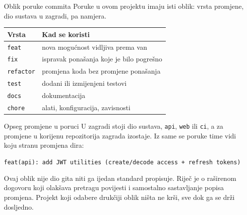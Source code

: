 \begin{frame}{Oblik poruke commita}
Poruke u ovom projektu imaju isti oblik: vrsta promjene, dio sustava u zagradi, pa namjera.

\vspace{0.5em}
\begin{center}
{\small
\setlength{\tabcolsep}{9pt}
\renewcommand{\arraystretch}{1.3}
\begin{tabular}{@{}lL{6.6cm}@{}}
  \toprule
  \textbf{Vrsta} & \textbf{Kad se koristi} \\
  \midrule
  \texttt{feat}     & nova mogućnost vidljiva prema van \\
  \texttt{fix}      & ispravak ponašanja koje je bilo pogrešno \\
  \texttt{refactor} & promjena koda bez promjene ponašanja \\
  \texttt{test}     & dodani ili izmijenjeni testovi \\
  \texttt{docs}     & dokumentacija \\
  \texttt{chore}    & alati, konfiguracija, zavisnosti \\
  \bottomrule
\end{tabular}
}
\end{center}
\end{frame}

\begin{frame}{Opseg promjene u poruci}
U zagradi stoji dio sustava, \texttt{api}, \texttt{web} ili \texttt{ci}, a za promjene u korijenu repozitorija zagrada izostaje. Iz same se poruke time vidi koju stranu promjena dira:

\vspace{0.5em}
\texttt{feat(api): add JWT utilities (create/decode access + refresh tokens)}

\vspace{0.6em}
\begin{konvencija}
Ovaj oblik nije dio gita niti ga ijedan standard propisuje. Riječ je o raširenom dogovoru koji olakšava pretragu povijesti i samostalno sastavljanje popisa promjena. Projekt koji odabere drukčiji oblik ništa ne krši, sve dok ga se drži dosljedno.
\end{konvencija}
\end{frame}

